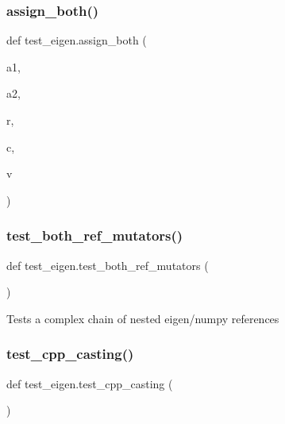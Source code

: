 \mbox{\label{namespacetest__eigen_abb13eb1b9345438ca55edc9600b99f75}} 
\subsubsection{\texorpdfstring{assign\_both()}{assign\_both()}}
{\footnotesize\ttfamily def test\+\_\+eigen.\+assign\+\_\+both (\begin{DoxyParamCaption}\item[{}]{a1,  }\item[{}]{a2,  }\item[{}]{r,  }\item[{}]{c,  }\item[{}]{v }\end{DoxyParamCaption})}

\mbox{\label{namespacetest__eigen_afb616baf11d5ad1e2c56d8ea7c841487}} 
\subsubsection{\texorpdfstring{test\_both\_ref\_mutators()}{test\_both\_ref\_mutators()}}
{\footnotesize\ttfamily def test\+\_\+eigen.\+test\+\_\+both\+\_\+ref\+\_\+mutators (\begin{DoxyParamCaption}{ }\end{DoxyParamCaption})}

\begin{DoxyVerb}Tests a complex chain of nested eigen/numpy references\end{DoxyVerb}
 \mbox{\label{namespacetest__eigen_a89bd422ef1dd99a7c6efffff71225ff7}} 
\subsubsection{\texorpdfstring{test\_cpp\_casting()}{test\_cpp\_casting()}}
{\footnotesize\ttfamily def test\+\_\+eigen.\+test\+\_\+cpp\+\_\+casting (\begin{DoxyParamCaption}{ }\end{DoxyParamCaption})}


